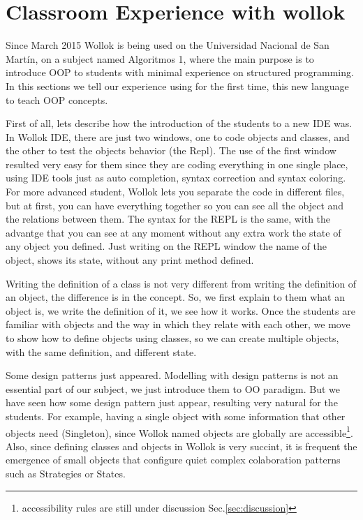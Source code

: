 \section{Classroom Experience with wollok}
\label{experience}

Since March 2015 Wollok is being used on the Universidad Nacional de San Martín, on a subject named Algoritmos 1, where the main purpose is to introduce OOP to students with minimal experience on structured programming.
In this sections we tell our experience using for the first time, this new language to teach OOP concepts.

First of all, lets describe how the introduction of the students to a new IDE was. In Wollok IDE, there are just two windows, one to code objects and classes, and the other to test the objects behavior (the Repl). The use of the first window resulted very easy for them since they are coding everything in one single place, using IDE tools just as auto completion, syntax correction and syntax coloring. For more advanced student, Wollok lets you separate the code in different files, but at first, you can have everything together so you can see all the object and the relations between them.
The syntax for the REPL is the same, with the advantge that you can see at any moment without any extra work the state of any object you defined. Just writing on the REPL window the name of the object, shows its state, without any print method defined.

Writing the definition of a class is not very different from writing the definition of an object, the difference is in the concept. So, we first explain to them what an object is, we write the definition of it, we see how it works. Once the students are familiar with objects and the way in which they relate with each other, we move to show how to define objects using classes, so we can create multiple objects, with the same definition, and different state.

Some design patterns just appeared. Modelling with design patterns is not an essential part of our subject, we just introduce them to OO paradigm. But we have seen how some design pattern just appear, resulting very natural for the students. For example, having a single object with some information that other objects need (Singleton), since Wollok named objects are globally are accessible\footnote{accessibility rules are still under discussion \cf Sec.\ref{sec:discussion}}. Also, since defining classes and objects in Wollok is very succint, it is frequent the emergence of small objects that configure quiet complex colaboration patterns such as Strategies or States\cite{Gamm93b}.


